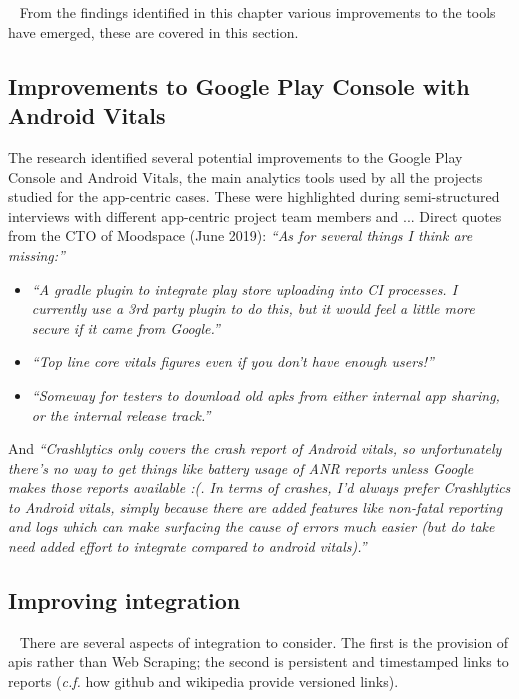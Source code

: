 \section{\itools}~\label{tata-itools-section}
From the findings identified in this chapter various improvements to the tools have emerged, these are covered in this section.

\subsection{Improvements to Google Play Console with Android Vitals}
The research identified several potential improvements to the Google Play Console and Android Vitals, the main analytics tools used by all the projects studied for the app-centric cases. These were highlighted during semi-structured interviews with different app-centric project team members and ...
Direct quotes from the CTO of Moodspace (June 2019): \emph{``As for several things I think are missing:''}
\begin{itemize}
    \item \textit{``A gradle plugin to integrate play store uploading into CI processes. I currently use a 3rd party plugin to do this, but it would feel a little more secure if it came from Google.''}
    \item \textit{``Top line core vitals figures even if you don't have enough users!''}
    \item \textit{``Someway for testers to download old apks from either internal app sharing, or the internal release track.''}
\end{itemize}

And \emph{``Crashlytics only covers the crash report of Android vitals, so unfortunately there's no way to get things like battery usage of ANR reports unless Google makes those reports available :(. In terms of crashes, I'd always prefer Crashlytics to Android vitals, simply because there are added features like non-fatal reporting and logs which can make surfacing the cause of errors much easier (but do take need added effort to integrate compared to android vitals).''}


\subsection{Improving integration}~\label{tata-improving-integration-topic}
There are several aspects of integration to consider. The first is the provision of \Gls{api}s rather than Web Scraping; the second is persistent and timestamped links to reports (\emph{c.f.} how github and wikipedia provide versioned links).

